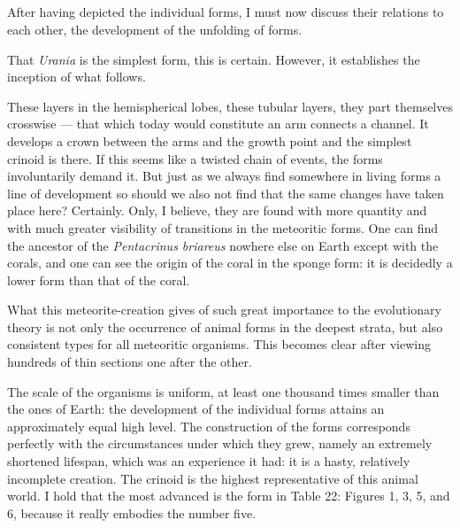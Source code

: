 \documentclass[a4paper, 12pt, oneside]{article}
\begin{document}
\subsection{}
\paragraph*{}
After having depicted the individual forms, I must now discuss their relations to each other, the development of the unfolding of forms.

That \emph{Urania} is the simplest form, this is certain. However, it establishes the inception of what follows.

These layers in the hemispherical lobes, these tubular layers, they part themselves crosswise --- that which today would constitute an arm connects a channel. It develops a crown between the arms and the growth point and the simplest crinoid is there. If this seems like a twisted chain of events, the forms involuntarily demand it. But just as we always find somewhere in living forms a line of development so should we also not find that the same changes have taken place here? Certainly. Only, I believe, they are found with more quantity and with much greater visibility of transitions in the meteoritic forms. One can find the ancestor of the \emph{Pentacrinus briareus} nowhere else on Earth except with the corals, and one can see the origin of the coral in the sponge form: it is decidedly a lower form than that of the coral.

What this meteorite-creation gives of such great importance to the evolutionary theory is not only the occurrence of animal forms in the deepest strata, but also consistent types for all meteoritic organisms. This becomes clear after viewing hundreds of thin sections one after the other.

The scale of the organisms is uniform, at least one thousand times smaller than the ones of Earth: the development of the individual forms attains an approximately equal high level. The construction of the forms corresponds perfectly with the circumstances under which they grew, namely an extremely shortened lifespan, which was an experience it had: it is a hasty, relatively incomplete creation. The crinoid is the highest representative of this animal world. I hold that the most advanced is the form in Table 22: Figures 1, 3, 5, and 6, because it really embodies the number five.
\end{document}
